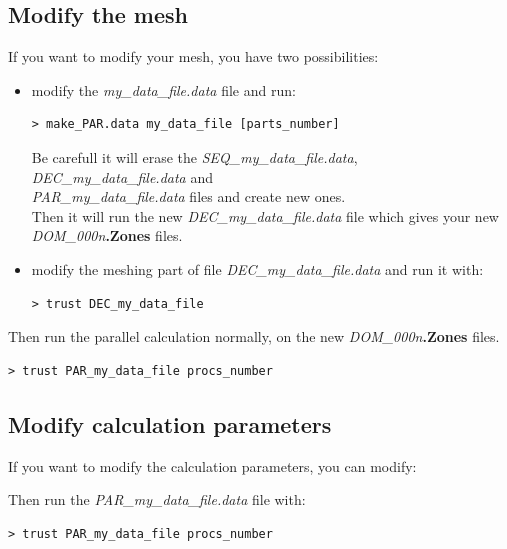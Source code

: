 \subsection{Modify the mesh}
If you want to modify your mesh, you have two possibilities:
\begin{itemize} 
\item modify the \textit{my\_data\_file.data} file and run:
\begin{verbatim}
> make_PAR.data my_data_file [parts_number]
\end{verbatim}
Be carefull it will erase the \textit{SEQ\_my\_data\_file.data}, \textit{DEC\_my\_data\_file.data} and \\
\textit{PAR\_my\_data\_file.data} files and create new ones.\\
Then it will run the new \textit{DEC\_my\_data\_file.data} file which gives your new \textit{DOM\_000n}\textbf{.Zones} files.

\item modify the meshing part of file \textit{DEC\_my\_data\_file.data} and run it with:
\begin{verbatim}
> trust DEC_my_data_file
\end{verbatim}
\end{itemize}

Then run the parallel calculation normally, on the new \textit{DOM\_000n}\textbf{.Zones} files.
\begin{verbatim}
> trust PAR_my_data_file procs_number
\end{verbatim}




\subsection{Modify calculation parameters}
If you want to modify the calculation parameters, you can modify:
Then run the \textit{PAR\_my\_data\_file.data} file with:
\begin{verbatim}
> trust PAR_my_data_file procs_number
\end{verbatim}

